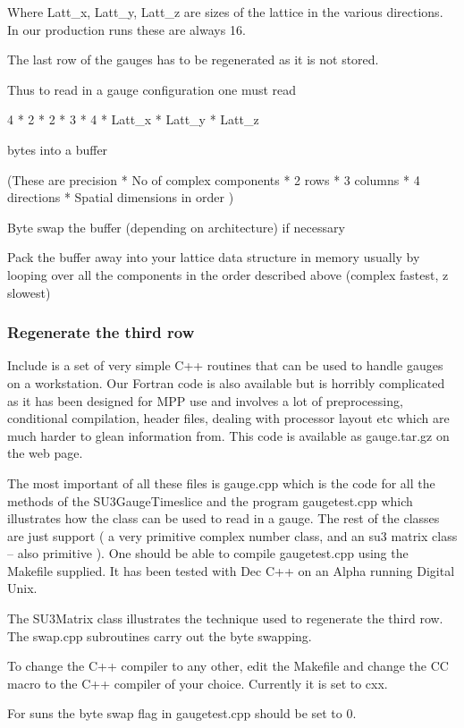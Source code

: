 \documentclass[12pt]{article}
\begin{document}
Where Latt\_x, Latt\_y, Latt\_z are sizes of the lattice in the various directions.
In our production runs these are always 16.

The last row of the gauges has to be regenerated as it is not stored.

Thus to read in a gauge configuration one must 
read

4 * 2 * 2 * 3 * 4 * Latt\_x * Latt\_y * Latt\_z 

bytes into a buffer

(These are 
	precision * No of complex components * 2 rows * 3 columns *
       	   4 directions * Spatial dimensions  in order
)

Byte swap the buffer (depending on architecture) if necessary

Pack the buffer away into your lattice data structure in memory usually by
looping over all the components in the order described above 
(complex fastest, z slowest)

\subsubsection{Regenerate the third row}
Include is a set of very simple C++ routines that can be used
to handle gauges on a workstation. Our Fortran code is also
available but is horribly complicated as it has been designed for
MPP use and involves a lot of preprocessing, conditional compilation,
header files,  dealing with processor layout etc which are much 
harder to glean information from. This code is available as gauge.tar.gz
on the web page.

The most important of all these files is gauge.cpp which is the 
code for all the methods of the SU3GaugeTimeslice and the program
gaugetest.cpp which illustrates how the class can be used to read in 
a gauge. The rest of the classes are just support ( a very primitive
complex number class, and an su3 matrix class -- also primitive ).
One should be able to compile gaugetest.cpp using the Makefile supplied.
It has been tested with Dec C++ on an Alpha running Digital Unix.

The SU3Matrix class illustrates the technique used to regenerate the 
third row. The swap.cpp subroutines carry out the byte swapping.

To change the C++ compiler to any other, edit the Makefile and change
the CC macro to the C++ compiler of your choice. Currently it is set to 
cxx.

For suns the byte swap flag in gaugetest.cpp should be set to 0.
\end{document}
